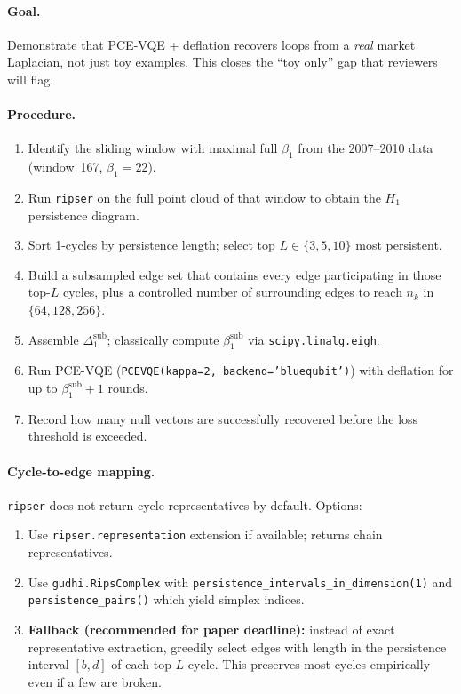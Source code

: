 \documentclass[11pt]{article}
\begin{document}
\paragraph*{Goal.} Demonstrate that PCE-VQE + deflation recovers
loops from a \emph{real} market Laplacian, not just toy examples.
This closes the ``toy only'' gap that reviewers will flag.

\paragraph*{Procedure.}
\begin{enumerate}[leftmargin=*]
  \item Identify the sliding window with maximal full $\beta_1$ from
        the 2007--2010 data (window~167, $\beta_1 = 22$).
  \item Run \texttt{ripser} on the full point cloud of that window
        to obtain the $H_1$ persistence diagram.
  \item Sort 1-cycles by persistence length; select top
        $L \in \{3, 5, 10\}$ most persistent.
  \item Build a subsampled edge set that contains every edge
        participating in those top-$L$ cycles, plus a controlled
        number of surrounding edges to reach $n_k$ in
        $\{64, 128, 256\}$.
  \item Assemble $\Delta_1^{\mathrm{sub}}$; classically compute
        $\beta_1^{\mathrm{sub}}$ via \texttt{scipy.linalg.eigh}.
  \item Run PCE-VQE (\texttt{PCEVQE(kappa=2, backend='bluequbit')})
        with deflation for up to $\beta_1^{\mathrm{sub}} + 1$ rounds.
  \item Record how many null vectors are successfully recovered
        before the loss threshold is exceeded.
\end{enumerate}

\paragraph*{Cycle-to-edge mapping.} \texttt{ripser} does not return
cycle representatives by default. Options:
\begin{enumerate}[label=(\alph*),leftmargin=*]
  \item Use \texttt{ripser.representation} extension if available;
        returns chain representatives.
  \item Use \texttt{gudhi.RipsComplex} with
        \texttt{persistence\_intervals\_in\_dimension(1)} and
        \texttt{persistence\_pairs()} which yield simplex indices.
  \item \textbf{Fallback (recommended for paper deadline):} instead
        of exact representative extraction, greedily select edges
        with length in the persistence interval $[b, d]$ of each
        top-$L$ cycle. This preserves most cycles empirically even
        if a few are broken.
\end{enumerate}
\end{document}
